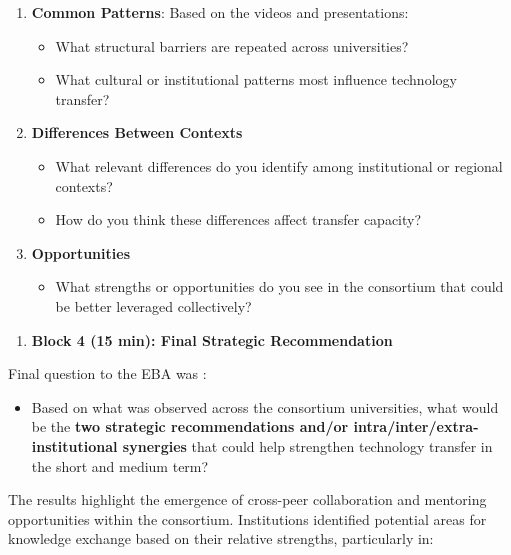 \documentclass[
  12pt,
  oneside]{book}
\providecommand{\tightlist}{%
  \setlength{\itemsep}{0pt}\setlength{\parskip}{0pt}}
\begin{document}
\begin{enumerate}
\def\labelenumi{\alph{enumi}.}
\tightlist
\item
  \textbf{Common Patterns}: Based on the videos and presentations:

  \begin{itemize}
  \tightlist
  \item
    What structural barriers are repeated across universities?
  \item
    What cultural or institutional patterns most influence technology
    transfer?
  \end{itemize}
\item
  \textbf{Differences Between Contexts}

  \begin{itemize}
  \tightlist
  \item
    What relevant differences do you identify among institutional or
    regional contexts?
  \item
    How do you think these differences affect transfer capacity?
  \end{itemize}
\item
  \textbf{Opportunities}

  \begin{itemize}
  \tightlist
  \item
    What strengths or opportunities do you see in the consortium that
    could be better leveraged collectively?
  \end{itemize}
\end{enumerate}

\begin{enumerate}
\def\labelenumi{\arabic{enumi}.}
\setcounter{enumi}{3}
\tightlist
\item
  \textbf{Block 4 (15 min): Final Strategic Recommendation}
\end{enumerate}

Final question to the EBA was :

\begin{itemize}
\tightlist
\item
  Based on what was observed across the consortium universities, what
  would be the \textbf{two strategic recommendations and/or
  intra/inter/extra-institutional synergies} that could help strengthen
  technology transfer in the short and medium term?
\end{itemize}

The results highlight the emergence of cross-peer collaboration and
mentoring opportunities within the consortium. Institutions identified
potential areas for knowledge exchange based on their relative
strengths, particularly in:
\end{document}

